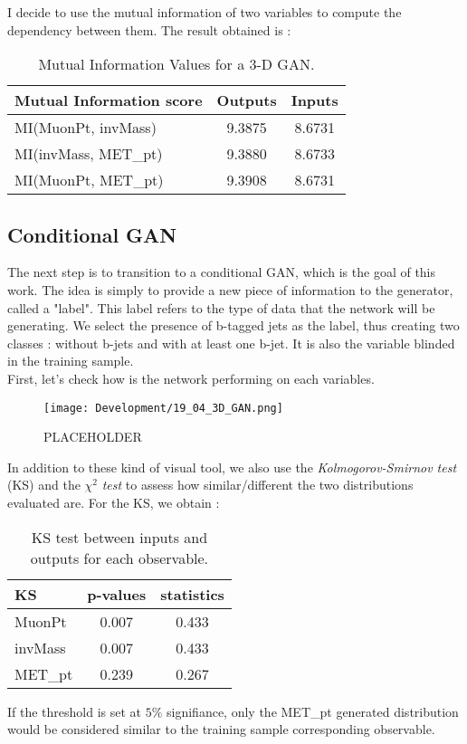 I decide to use the mutual information of two variables to compute the dependency between them. The result obtained is : 

\begin{table}[h]
    \centering
    \begin{tabular}{|l|c|c|}
        \hline
        \textbf{Mutual Information score} & \textbf{Outputs} & \textbf{Inputs} \\
        \hline
        MI(MuonPt, invMass) & 9.3875 & 8.6731 \\
        MI(invMass, MET\_pt) & 9.3880 & 8.6733 \\
        MI(MuonPt, MET\_pt) & 9.3908 & 8.6731 \\
        \hline
    \end{tabular}
    \caption{Mutual Information Values for a 3-D GAN.}
    \label{tab:mi_values}
\end{table}

\newpage

\subsection{Conditional GAN}

The next step is to transition to a conditional GAN, which is the goal of this work. The idea is simply to provide a new piece of information to the generator, called a "label". This label refers to the type of data that the network will be generating. We select the presence of b-tagged jets as the label, thus creating two classes : without b-jets and with at least one b-jet. It is also the variable blinded in the training sample.\\

First, let's check how is the network performing on each variables.\\

\begin{figure}[H]
    \centering
    \texttt{[image: Development/19\_04\_3D\_GAN.png]}
    \caption{PLACEHOLDER}
    \label{fig:enter-label}
\end{figure}

In addition to these kind of visual tool, we also use the \textit{Kolmogorov-Smirnov test} (KS) and the $\chi^2$ \textit{test} to assess how similar/different the two distributions evaluated are. For the KS, we obtain : 
\begin{table}[H]
    \centering
    \begin{tabular}{|l|c|c|}
        \hline
        \textbf{KS} & \textbf{p-values} & \textbf{statistics}  \\
        \hline
        MuonPt & 0.007 & 0.433\\
        invMass & 0.007 & 0.433\\
        MET\_pt & 0.239 & 0.267\\
        \hline
    \end{tabular}
    \caption{KS test between inputs and outputs for each observable.}
\end{table}
If the threshold is set at $5\%$ signifiance, only the MET\_pt generated distribution would be considered similar to the training sample corresponding observable.

